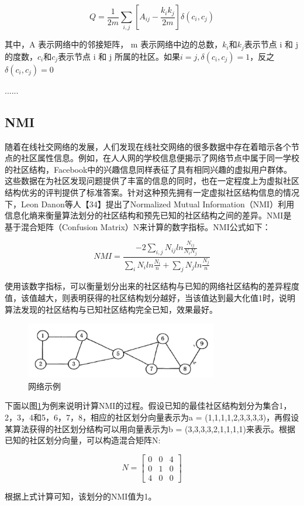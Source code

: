 \begin{equation}
  \label{eqn:LBmodel}
  Q=\frac{1}{2m}\sum_{i,j}\left [ A_{ij}-\frac{k_ik_j}{2m} \right ]\delta (c_i, c_j)  
\end{equation}

其中，A 表示网络中的邻接矩阵， m 表示网络中边的总数，$k_i$和$k_j$表示节点 i 和 j 的度数，$c_i$和$c_j$表示节点 i 和 j 所属的社区。如果$i=j,\delta(c_i,c_j)=1$，反之$\delta(c_i,c_j)=0$

......

\subsection{NMI}

随着在线社交网络的发展，人们发现在线社交网络的很多数据中存在着暗示各个节点的社区属性信息。例如，在人人网的学校信息便揭示了网络节点中属于同一学校的社区结构，Facebook中的兴趣信息同样表征了具有相同兴趣的虚拟用户群体。这些数据在为社区发现问题提供了丰富的信息的同时，也在一定程度上为虚拟社区结构优劣的评判提供了标准答案。针对这种预先拥有一定虚拟社区结构信息的情况下，Leon Danon等人【34】提出了Normalized Mutual Information（NMI）利用信息化熵来衡量算法划分的社区结构和预先已知的社区结构之间的差异。NMI是基于混合矩阵（Confusion Matrix）N来计算的数字指标。NMI公式如下：

\begin{equation}
  \label{eqn:LBmodel}
  NMI=\frac{ -2 \sum_{i,j} N_{ij}  ln{\frac{N_{ij}}{N_iN_j}} } {\sum_{i}N_iln{\frac{N_i}{n}}+\sum_{j}N_jln{\frac{N_j}{n}}}
\end{equation}

使用该数字指标，可以衡量划分出来的社区结构与已知的网络社区结构的差异程度值，该值越大，则表明获得的社区结构划分越好，当该值达到最大化值1时，说明算法发现的社区结构与已知社区结构完全已知，效果最好。

\begin{figure}
  \centering
  \includegraphics[width=0.75\textwidth]{figures/fig2-2}
  \caption{网络示例}\label{fig:fig2-2}
\end{figure}

下面以图\ref{fig:fig2-2}为例来说明计算NMI的过程。假设已知的最佳社区结构划分为集合{1，2，3，4}和{5，6，7，8}，相应的社区划分向量表示为a = (1,1,1,1,2,3,3,3,3)，再假设某算法获得的社区划分结构可以用向量表示为b = (3,3,3,3,2,1,1,1,1)来表示。根据已知的社区划分向量，可以构造混合矩阵N:

\begin{equation}
  \label{eqn:LBmodel}
  N=\begin{bmatrix}
    0 & 0 &4 \\ 
    0 & 1 & 0\\ 
    4 & 0 & 0
    \end{bmatrix}
\end{equation}

根据上式计算可知，该划分的NMI值为1。
